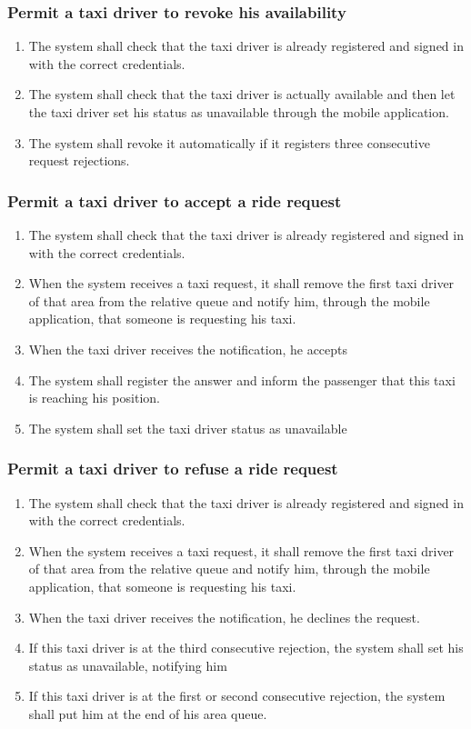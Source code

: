 \subsubsection{Permit a taxi driver to revoke his availability}
\begin{enumerate}[label=\bfseries R\arabic*:]
	\item The system shall check that the taxi driver is already registered and signed in with
	the correct	credentials.
	\item The system shall check that the taxi driver is actually available and then
	let the taxi driver set his status as unavailable through the mobile application.
	\item The system shall revoke it automatically if it registers three consecutive request
	rejections.
\end{enumerate}
\subsubsection{Permit a taxi driver to accept a ride request}
\begin{enumerate}[label=\bfseries R\arabic*:]
	\item The system shall check that the taxi driver is already registered and signed in with
	the correct	credentials.
	\item When the system receives a taxi request, it shall remove the first taxi driver
	of that area from the relative queue and notify him, through the mobile application,
	that someone is requesting his taxi.
	\item When the taxi driver receives the notification, he accepts
	\item The system shall register the answer and inform the passenger
	that this taxi is reaching his position.
	\item The system shall set the taxi driver status as unavailable
\end{enumerate}
\subsubsection{Permit a taxi driver to refuse a ride request}
\begin{enumerate}[label=\bfseries R\arabic*:]
	\item The system shall check that the taxi driver is already registered and signed in with
	the correct	credentials.
	\item When the system receives a taxi request, it shall remove the first taxi driver
	of that area from the relative queue and notify him, through the mobile application,
	that someone is requesting his taxi.
	\item When the taxi driver receives the notification, he declines the request.
	\item If this taxi driver is at the third consecutive rejection, the system shall set his status as unavailable,
	notifying him
	\item If this taxi driver is at the first or second consecutive rejection, the system shall put him
	at the end of his area queue.
\end{enumerate}
